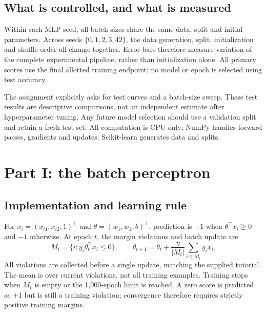 \documentclass[10pt,a4paper]{article}
\begin{document}
\subsection{What is controlled, and what is measured}
Within each MLP seed, all batch sizes share the same data, split and initial
parameters. Across seeds $\{0,1,2,3,42\}$, the data generation, split,
initialization and shuffle order all change together. Error bars therefore
measure variation of the complete experimental pipeline, rather than
initialization alone. All primary scores use the final allotted training
endpoint; no model or epoch is selected using test accuracy.

The assignment explicitly asks for test curves and a batch-size sweep. These
test results are descriptive comparisons, not an independent estimate after
hyperparameter tuning. Any future model selection should use a validation
split and retain a fresh test set. All computation is CPU-only; NumPy handles
forward passes, gradients and updates. Scikit-learn generates data and splits.

\clearpage
\section{Part I: the batch perceptron}
\subsection{Implementation and learning rule}
For $\bar x_i=(x_{i1},x_{i2},1)^\top$ and
$\theta=(w_1,w_2,b)^\top$, prediction is $+1$ when
$\theta^\top\bar x_i\geq0$ and $-1$ otherwise. At epoch $t$, the margin
violations and batch update are
\[
 M_t=\{i:y_i\theta_t^\top\bar x_i\leq0\},\qquad
 \theta_{t+1}=\theta_t+\frac{\eta}{|M_t|}\sum_{i\in M_t}y_i\bar x_i.
\]
All violations are collected before a single update, matching the supplied
tutorial. The mean is over current violations, not all training examples.
Training stops when $M_t$ is empty or the 1,000-epoch limit is reached. A
zero score is predicted as $+1$ but is still a training violation; convergence
therefore requires strictly positive training margins.
\end{document}
